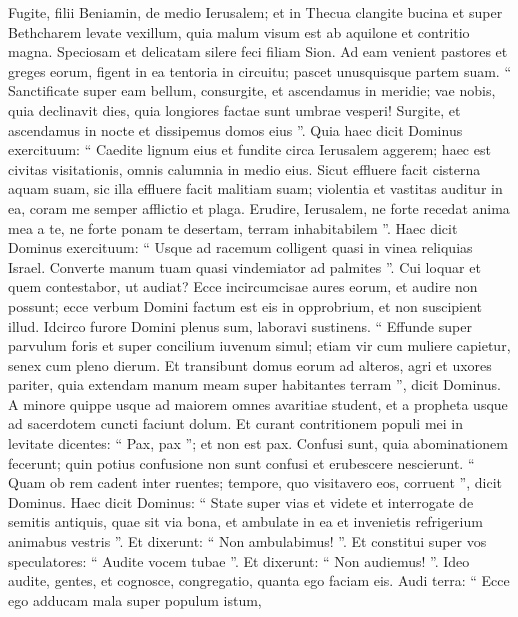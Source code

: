 \begin{biblechapter}
\begin{biblechapter}
\begin{biblechapter}
\begin{biblechapter}
\begin{biblechapter}
\begin{biblechapter}
\verse Fugite, filii Beniamin,
 de medio Ierusalem;
 et in Thecua clangite bucina
 et super Bethcharem levate vexillum,
 quia malum visum est ab aquilone
 et contritio magna.
 \verse Speciosam et delicatam silere feci
 filiam Sion.
 \verse Ad eam venient pastores et greges eorum,
 figent in ea tentoria in circuitu;
 pascet unusquisque partem suam.
 \verse “ Sanctificate super eam bellum,
 consurgite, et ascendamus in meridie;
 vae nobis, quia declinavit dies,
 quia longiores factae sunt umbrae vesperi!
 \verse Surgite, et ascendamus in nocte
 et dissipemus domos eius ”.
 \verse Quia haec dicit Dominus exercituum:
 “ Caedite lignum eius
 et fundite circa Ierusalem aggerem;
 haec est civitas visitationis,
 omnis calumnia in medio eius.
 \verse Sicut effluere facit cisterna aquam suam,
 sic illa effluere facit malitiam suam;
 violentia et vastitas auditur in ea,
 coram me semper afflictio et plaga.
 \verse Erudire, Ierusalem,
 ne forte recedat anima mea a te,
 ne forte ponam te desertam,
 terram inhabitabilem ”.
 \verse Haec dicit Dominus exercituum:
 “ Usque ad racemum colligent quasi in vinea
 reliquias Israel.
 Converte manum tuam
 quasi vindemiator ad palmites ”.
 \verse Cui loquar et quem contestabor, ut audiat?
 Ecce incircumcisae aures eorum,
 et audire non possunt;
 ecce verbum Domini factum est eis in opprobrium,
 et non suscipient illud.
 \verse Idcirco furore Domini plenus sum,
 laboravi sustinens.
 “ Effunde super parvulum foris
 et super concilium iuvenum simul;
 etiam vir cum muliere capietur,
 senex cum pleno dierum.
 \verse Et transibunt domus eorum ad alteros,
 agri et uxores pariter,
 quia extendam manum meam
 super habitantes terram ”,
 dicit Dominus.
 \verse A minore quippe usque ad maiorem
 omnes avaritiae student,
 et a propheta usque ad sacerdotem
 cuncti faciunt dolum.
 \verse Et curant contritionem populi mei in levitate
 dicentes: “ Pax, pax ”; et non est pax.
 \verse Confusi sunt, quia abominationem fecerunt;
 quin potius confusione non sunt confusi
 et erubescere nescierunt.
 “ Quam ob rem cadent inter ruentes;
 tempore, quo visitavero eos, corruent ”,
 dicit Dominus.
 \verse Haec dicit Dominus:
 “ State super vias et videte
 et interrogate de semitis antiquis,
 quae sit via bona, et ambulate in ea
 et invenietis refrigerium animabus vestris ”.
 Et dixerunt: “ Non ambulabimus! ”.
 \verse Et constitui super vos speculatores:
 “ Audite vocem tubae ”.
 Et dixerunt: “ Non audiemus! ”.
 \verse Ideo audite, gentes,
 et cognosce, congregatio,
 quanta ego faciam eis.
 \verse Audi terra: “ Ecce ego adducam mala super populum istum,

\end{biblechapter}
\end{biblechapter}
\end{biblechapter}
\end{biblechapter}
\end{biblechapter}
\end{biblechapter}
